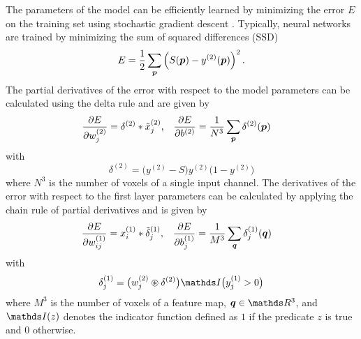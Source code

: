 The parameters of the model can be efficiently learned by minimizing the error
$E$ on the training set using stochastic gradient descent
\cite{LeCun1998}. Typically, neural networks are trained by minimizing the sum
of squared differences (SSD)
\begin{equation}
E = \frac{1}{2}\sum_{\vect{p}}\left(S(\vect{p}) -
y^{(2)}(\vect{p})\right)^2.
\end{equation}
The partial derivatives of the error with respect to the model parameters can be
calculated using the delta rule and are given by
\begin{align}
\frac{\partial E}{\partial w^{(2)}_j} &= \delta^{(2)} * \tilde{x}^{(2)}_j
\text{,} &
\frac{\partial E}{\partial b^{(2)}} &= \frac{1}{N^3}\sum_{\vect{p}}
\delta^{(2)}(\vect{p})
\label{eq:dE2}
\end{align}
with 
\begin{equation}
\delta^{(2)} = \big(y^{(2)} -S\big)y^{(2)}\big(1-y^{(2)}\big)
\label{eq:delta2}
\end{equation}
where $N^3$ is the number of voxels of a single input channel. The derivatives
of the error with respect to the first layer parameters can be calculated by
applying the chain rule of partial derivatives and is given by
\begin{align}
\frac{\partial E}{\partial w^{(1)}_{ij}} &= x^{(1)}_i * \tilde{\delta}^{(1)}_j,
&
\frac{\partial E}{\partial b^{(1)}_j} &= \frac{1}{M^3}\sum_{\vect{q}}
\delta^{(1)}_j(\vect{q})
\label{eq:dE1}
\end{align}
with
\begin{equation}
\delta^{(1)}_j = \big(w^{(2)}_{j}\circledast\delta^{(2)}\big)\I\big(y^{(1)}_j >
0\big)
\label{eq:delta1}
\end{equation}
where $M^3$ is the number of voxels of a feature map, $\vect{q} \in \R^3$, and
$\I(z)$ denotes the indicator function defined as $1$ if the predicate
$z$ is true and $0$ otherwise.

